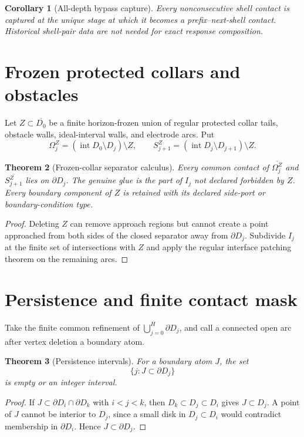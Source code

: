 \documentclass[11pt]{article}
\newtheorem{theorem}{Theorem}[section]
\newtheorem{corollary}[theorem]{Corollary}
\theoremstyle{definition}
\theoremstyle{remark}
\newcommand{\Int}{\operatorname{int}}
\begin{document}
\begin{corollary}[All-depth bypass capture]
Every nonconsecutive shell contact is captured at the unique stage at which it
becomes a prefix--next-shell contact.  Historical shell-pair data are not
needed for exact response composition.
\end{corollary}

\section{Frozen protected collars and obstacles}
Let $Z\subset\overline{D_0}$ be a finite horizon-frozen union of regular
protected collar tails, obstacle walls, ideal-interval walls, and electrode
arcs.  Put
\[
 \Omega_j^Z=(\Int D_0\setminus D_j)\setminus Z,
 \qquad
 S_{j+1}^Z=(\Int D_j\setminus D_{j+1})\setminus Z.
\]

\begin{theorem}[Frozen-collar separator calculus]
Every common contact of $\overline{\Omega_j^Z}$ and
$\overline{S_{j+1}^Z}$ lies on $\partial D_j$.  The genuine glue is the part
of $I_j$ not declared forbidden by $Z$.  Every boundary component of $Z$ is
retained with its declared side-port or boundary-condition type.
\end{theorem}

\begin{proof}
Deleting $Z$ can remove approach regions but cannot create a point approached
from both sides of the closed separator away from $\partial D_j$.  Subdivide
$I_j$ at the finite set of intersections with $Z$ and apply the regular
interface patching theorem on the remaining arcs.
\end{proof}

\section{Persistence and finite contact mask}
Take the finite common refinement of $\bigcup_{j=0}^H\partial D_j$, and call
a connected open arc after vertex deletion a boundary atom.

\begin{theorem}[Persistence intervals]
For a boundary atom $J$, the set
\[
 \{j:J\subset\partial D_j\}
\]
is empty or an integer interval.
\end{theorem}

\begin{proof}
If $J\subset\partial D_i\cap\partial D_k$ with $i<j<k$, then
$D_k\subset D_j\subset D_i$ gives $J\subset D_j$.  A point of $J$ cannot be
interior to $D_j$, since a small disk in $D_j\subset D_i$ would contradict
membership in $\partial D_i$.  Hence $J\subset\partial D_j$.
\end{proof}
\end{document}
